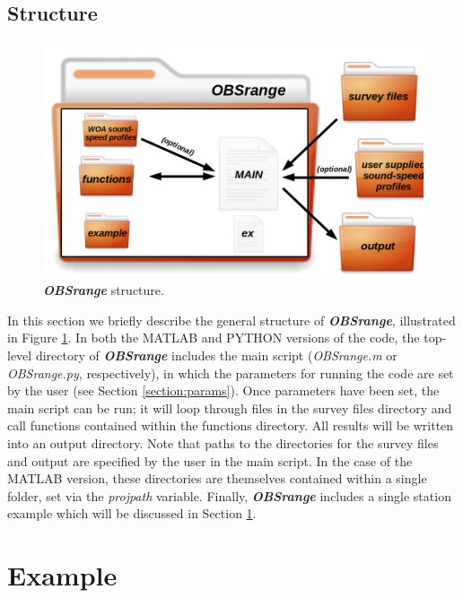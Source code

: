 \documentclass[titlepage, 12pt]{article}
\begin{document}
  \subsection{Structure}
   
   \begin{figure}[!htb]
    \includegraphics[width=\linewidth]{OBSrange_structure.png}
    \caption{\textbf{\textit{OBSrange}} structure.}
    \label{fig:struct}
   \end{figure}

   In this section we briefly describe the general structure of \textbf{\textit{OBSrange}},  illustrated in Figure \ref{fig:struct}. In both the MATLAB and PYTHON versions of the code, the top-level directory of \textbf{\textit{OBSrange}} includes the main script (\textit{OBSrange.m} or \textit{OBSrange.py}, respectively), in which the parameters for running the code are set by the user (see Section \ref{section:params}). Once parameters have been set, the main script can be run; it will loop through files in the survey files directory and call functions contained within the functions directory. All results will be written into an output directory. Note that paths to the directories for the survey files and output are specified by the user in the main script. In the case of the MATLAB version, these directories are themselves contained within a single folder, set via the \textit{projpath} variable. Finally, \textbf{\textit{OBSrange}} includes a single station example which will be discussed in Section \ref{section:ex}.

 
 \section{Example}
 \label{section:ex}
\end{document}
